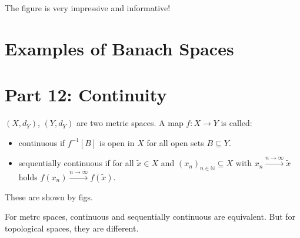 \documentclass[../../note.tex]{subfiles}
\begin{document}
The figure is very impressive and informative!


\section{Examples of Banach Spaces}





\section{Part 12: Continuity}
\begin{definition}
    $(X,d_Y)$, $(Y,d_Y)$ are two metric spaces. A map $f: X \rightarrow Y$ is called: 
    \begin{itemize}
        \item continuous if $f^{-1}[B]$ is open in $X$ for all open sets $B \subseteq Y$.
        \item sequentially continuous if for all $\tilde{x} \in X$ and $(x_n)_{n \in \mathbb{N}} \subseteq X$ with $x_n \stackrel{n \rightarrow \infty}{\longrightarrow} \tilde{x}$ holds $f(x_n) \stackrel{n \rightarrow \infty}{\longrightarrow} f(\tilde{x})$.
    \end{itemize}
\end{definition}
These are shown by figs.

\begin{lemma}
    For metrc spaces, continuous and sequentially continuous are equivalent. But for topological spaces, they are different.
\end{lemma}
\end{document}

